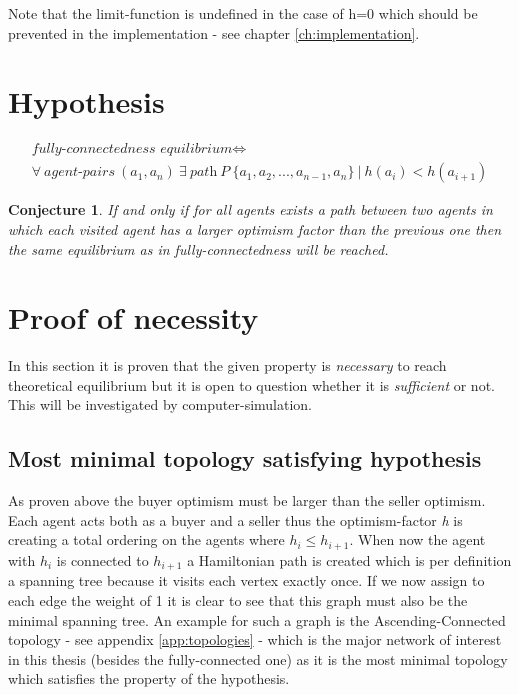 \documentclass[Bachelorarbeit.tex]{subfiles}
\begin{document}
Note that the limit-function is undefined in the case of h=0 which should be prevented in the implementation - see chapter \ref{ch:implementation}.

\section{Hypothesis}
\begin{equation}
\begin{split}
\textit{fully-connectedness equilibrium} \iff \\
\forall \: \textit{agent-pairs} \: (a_{1},a_{n}) \: \exists \:  \textit{path} \: P \: \{a_{1}, a_{2}, ... , a_{n-1}, a_{n}\} \: | \: h(a_{i}) < h(a_{i+1})
\end{split}
\end{equation}

\newtheorem{conj}{Conjecture}
\begin{conj}
If and only if for all agents exists a path between two agents in which each visited agent has a larger optimism factor than the previous one then the same equilibrium as in fully-connectedness will be reached.
\end{conj}

\section{Proof of necessity}
In this section it is proven that the given property is \textit{necessary} to reach theoretical equilibrium but it is open to question whether it is \textit{sufficient} or not. This will be investigated by computer-simulation.

\subsection{Most minimal topology satisfying hypothesis}
As proven above the buyer optimism must be larger than the seller optimism. Each agent acts both as a buyer and a seller thus the optimism-factor \textit{h} is creating a total ordering on the agents where $h_i \leq h_{i+1}$. When now the agent with $h_i$ is connected to $h_{i+1}$ a Hamiltonian path is created which is per definition a spanning tree because it visits each vertex exactly once. If we now assign to each edge the weight of 1 it is clear to see that this graph must also be the minimal spanning tree. An example for such a graph is the Ascending-Connected topology - see appendix \ref{app:topologies} - which is the major network of interest in this thesis (besides the fully-connected one) as it is the most minimal topology which satisfies the property of the hypothesis.
\end{document}
